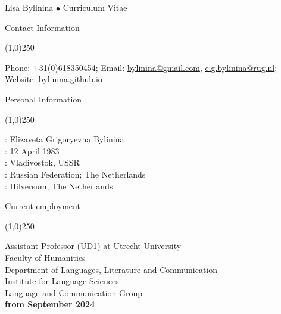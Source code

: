 \documentclass[12pt,letterpaper]{article}
\begin{document}
{\centering
    \LARGE{Lisa Bylinina $\bullet$ Curriculum Vitae}
\\}

\vspace{6mm}

\noindent \Large{Contact Information}

\vspace{-4mm}
\noindent\line(1,0){250}

\small{
\noindent Phone: +31(0)618350454;  Email: \href{mailto://bylinina@gmail.com}{bylinina@gmail.com}, \href{mailto://e.g.bylinina@rug.nl}{e.g.bylinina@rug.nl}; Website: \href{https://bylinina.github.io}{bylinina.github.io}
}

\vspace{5mm}

\noindent \Large{Personal Information}

\vspace{-4mm}
\noindent\line(1,0){250}

\small{
: Elizaveta Grigoryevna Bylinina\\
: 12 April 1983\\
: Vladivostok, USSR\\ 
: Russian Federation; The Netherlands\\ 
: Hilversum, The Netherlands
}

\vspace{4mm}

\noindent \Large{Current employment}

\vspace{-4mm}
\noindent\line(1,0){250}


\small{
\noindent Assistant Professor (UD1) at Utrecht University\\Faculty of Humanities\\
Department of Languages, Literature and Communication \\
\href{https://www.uu.nl/en/research/institute-for-language-sciences}{Institute for Language Sciences}\\
\href{https://www.uu.nl/staff/organisationalchart/gw/149/1002}{Language and Communication Group}\\
\textbf{from September 2024}
}


\vspace{5mm}
\end{document}

